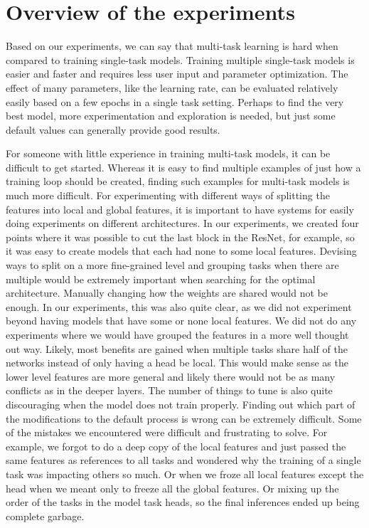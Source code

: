 \section{Overview of the experiments}
Based on our experiments, we can say that multi-task learning is hard when compared to training single-task models.
Training multiple single-task models is easier and faster and requires less user input and parameter optimization.
The effect of many parameters, like the learning rate, can be evaluated relatively easily based on a few epochs in a single task setting.
Perhaps to find the very best model, more experimentation and exploration is needed, but just some default values can generally provide good results.

For someone with little experience in training multi-task models, it can be difficult to get started.
Whereas it is easy to find multiple examples of just how a training loop should be created, finding such examples for multi-task models is much more difficult.
For experimenting with different ways of splitting the features into local and global features, it is important to have systems for easily doing experiments on different architectures.
In our experiments, we created four points where it was possible to cut the last block in the ResNet, for example, so it was easy to create models that each had none to some local features.
Devising ways to split on a more fine-grained level and grouping tasks when there are multiple would be extremely important when searching for the optimal architecture.
Manually changing how the weights are shared would not be enough.
In our experiments, this was also quite clear, as we did not experiment beyond having models that have some or none local features.
We did not do any experiments where we would have grouped the features in a more well thought out way.
Likely, most benefits are gained when multiple tasks share half of the networks instead of only having a head be local.
This would make sense as the lower level features are more general and likely there would not be as many conflicts as in the deeper layers.
The number of things to tune is also quite discouraging when the model does not train properly.
Finding out which part of the modifications to the default process is wrong can be extremely difficult.
Some of the mistakes we encountered were difficult and frustrating to solve. 
For example, we forgot to do a deep copy of the local features and just passed the same features as references to all tasks and wondered why the training of a single task was impacting others so much.
Or when we froze all local features except the head when we meant only to freeze all the global features.
Or mixing up the order of the tasks in the model task heads, so the final inferences ended up being complete garbage.

